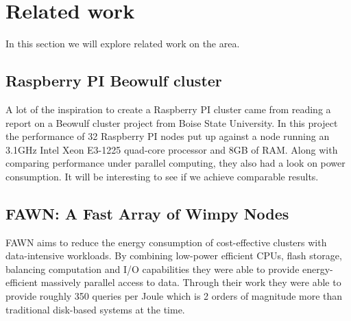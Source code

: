 \clearpage
\section{Related work}
\label{sec:related}
In this section we will explore related work on the area.
\subsection{Raspberry PI Beowulf cluster}
A lot of the inspiration to create a Raspberry PI cluster came from reading a report on a Beowulf cluster project from Boise State University.\cite{RPI_BEOWULF} In this project the performance of 32 Raspberry PI nodes put up against a node running an 3.1GHz Intel Xeon E3-1225 quad-core processor and 8GB of RAM. Along with comparing performance under parallel computing, they also had a look on power consumption. It will be interesting to see if we achieve comparable results. 

\subsection{FAWN: A Fast Array of Wimpy Nodes}
FAWN\cite{fawn} aims to reduce the energy consumption of cost-effective clusters with data-intensive workloads. By combining low-power efficient CPUs, flash storage, balancing computation and I/O capabilities they were able to provide energy-efficient massively parallel access to data. 
Through their work they were able to provide roughly 350 queries per Joule which is 2 orders of magnitude more than traditional disk-based systems at the time. 

